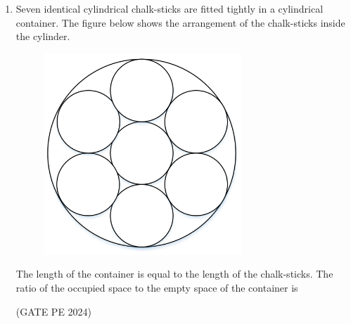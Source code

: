 \documentclass[journal,12pt,onecolumn]{IEEEtran}
\theoremstyle{remark}
\begin{document}
\begin{enumerate}
\item Seven identical cylindrical chalk-sticks are fitted tightly in a cylindrical container. The figure below shows the arrangement of the chalk-sticks inside the cylinder.
\begin{figure}[H]
    \centering
    \includegraphics[width=0.5\columnwidth]{Q_7.png}
    \caption{}
    \label{fig:placeholder}
\end{figure}
The length of the container is equal to the length of the chalk-sticks. The ratio of the occupied space to the empty space of the container is
\begin{enumerate}
\end{enumerate}
\hfill{(GATE PE 2024)}


\end{enumerate}
\end{document}
